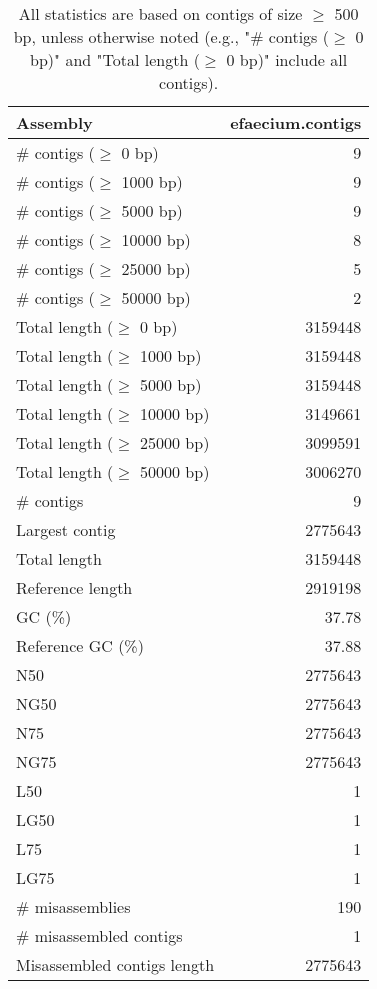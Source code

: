 \documentclass[12pt,a4paper]{article}
\begin{document}
\begin{table}[ht]
\begin{center}
\caption{All statistics are based on contigs of size $\geq$ 500 bp, unless otherwise noted (e.g., "\# contigs ($\geq$ 0 bp)" and "Total length ($\geq$ 0 bp)" include all contigs).}
\begin{tabular}{|l*{1}{|r}|}
\hline
Assembly & efaecium.contigs \\ \hline
\# contigs ($\geq$ 0 bp) & 9 \\ \hline
\# contigs ($\geq$ 1000 bp) & 9 \\ \hline
\# contigs ($\geq$ 5000 bp) & 9 \\ \hline
\# contigs ($\geq$ 10000 bp) & 8 \\ \hline
\# contigs ($\geq$ 25000 bp) & 5 \\ \hline
\# contigs ($\geq$ 50000 bp) & 2 \\ \hline
Total length ($\geq$ 0 bp) & 3159448 \\ \hline
Total length ($\geq$ 1000 bp) & 3159448 \\ \hline
Total length ($\geq$ 5000 bp) & 3159448 \\ \hline
Total length ($\geq$ 10000 bp) & 3149661 \\ \hline
Total length ($\geq$ 25000 bp) & 3099591 \\ \hline
Total length ($\geq$ 50000 bp) & 3006270 \\ \hline
\# contigs & 9 \\ \hline
Largest contig & 2775643 \\ \hline
Total length & 3159448 \\ \hline
Reference length & 2919198 \\ \hline
GC (\%) & 37.78 \\ \hline
Reference GC (\%) & 37.88 \\ \hline
N50 & 2775643 \\ \hline
NG50 & 2775643 \\ \hline
N75 & 2775643 \\ \hline
NG75 & 2775643 \\ \hline
L50 & 1 \\ \hline
LG50 & 1 \\ \hline
L75 & 1 \\ \hline
LG75 & 1 \\ \hline
\# misassemblies & 190 \\ \hline
\# misassembled contigs & 1 \\ \hline
Misassembled contigs length & 2775643 \\ \hline

\end{tabular}
\end{center}
\end{table}
\end{document}
